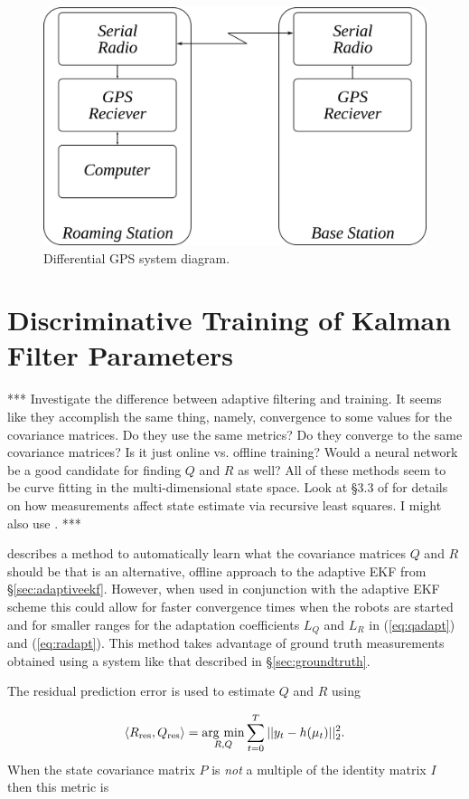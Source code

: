 \begin{figure}[ht!]
	\centering
	\includegraphics[width=.6\textwidth]{images/dgps}
	\caption{Differential GPS system diagram.}
	\label{fig:dgps}
\end{figure}

\section{Discriminative Training of Kalman Filter Parameters}
\label{sec:trainingkfparams}
*** Investigate the difference between adaptive filtering and training. It seems like they accomplish the same thing, namely, convergence to some values for the covariance matrices. Do they use the same metrics? Do they converge to the same covariance matrices? Is it just online vs. offline training? Would a neural network be a good candidate for finding $Q$ and $R$ as well? All of these methods seem to be curve fitting in the multi-dimensional state space. Look at \S3.3 of \cite{Simon06OptimalEstimation} for details on how measurements affect state estimate via recursive least squares. I might also use \cite{Orderud05}. ***

\cite{Abbeel-RSS-05} describes a method to automatically learn what the covariance matrices $Q$ and $R$ should be that is an alternative, offline approach to the adaptive EKF from \S\ref{sec:adaptiveekf}. However, when used in conjunction with the adaptive EKF scheme this could allow for faster convergence times when the robots are started and for smaller ranges for the adaptation coefficients $L_Q$ and $L_R$ in (\ref{eq:qadapt}) and (\ref{eq:radapt}). This method takes advantage of ground truth measurements obtained using a system like that described in \S\ref{sec:groundtruth}.

The residual prediction error is used to estimate $Q$ and $R$ using

\begin{align*}
\left<R_{\text{res}},Q_{\text{res}}\right> = \mathop{\arg\,\min}\limits_{R,Q}\sum_{t=0}^T ||y_t-h(\mu_t)||_2^2.
\end{align*}
When the state covariance matrix $P$ is \textit{not} a multiple of the identity matrix $I$ then this metric is

